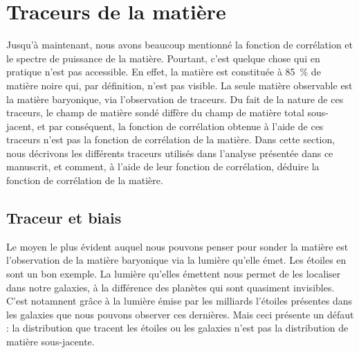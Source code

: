 \documentclass[11pt, twoside, a4paper, openright]{report}
\begin{document}
\section{Traceurs de la matière}
Jusqu'à maintenant, nous avons beaucoup mentionné la fonction de corrélation et le spectre de puissance de la matière. Pourtant, c'est quelque chose qui en pratique n'est pas accessible. En effet, la matière est constituée à \SI{85}{\percent} de matière noire qui, par définition, n'est pas visible. La seule matière observable est la matière baryonique, via l'observation de traceurs. Du fait de la nature de ces traceurs, le champ de matière sondé diffère du champ de matière total sous-jacent, et par conséquent, la fonction de corrélation obtenue à l'aide de ces traceurs n'est pas la fonction de corrélation de la matière. Dans cette section, nous décrivons les différents traceurs utilisés dans l'analyse présentée dans ce manuscrit, et comment, à l'aide de leur fonction de corrélation, déduire la fonction de corrélation de la matière.


\subsection{Traceur et biais}
Le moyen le plus évident auquel nous pouvons penser pour sonder la matière est l'observation de la matière baryonique via la lumière qu'elle émet. Les étoiles en sont un bon exemple. La lumière qu'elles émettent nous permet de les localiser dans notre galaxies, à la différence des planètes qui sont quasiment invisibles. C'est notamnent grâce à la lumière émise par les milliards l'étoiles présentes dans les galaxies que nous pouvons observer ces dernières. Mais ceci présente un défaut : la distribution que tracent les étoiles ou les galaxies n'est pas la distribution de matière sous-jacente.
\end{document}
